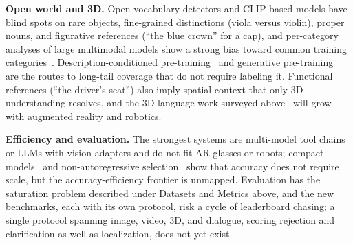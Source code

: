 \textbf{Open world and 3D.} Open-vocabulary detectors and CLIP-based models have blind spots on rare objects, fine-grained distinctions (viola versus violin), proper nouns, and figurative references (``the blue crown'' for a cap), and per-category analyses of large multimodal models show a strong bias toward common training categories~\cite{chen2025revisiting}. Description-conditioned pre-training~\cite{li2023desco} and generative pre-training~\cite{bagchi2025refereverything,gabeur2026image} are the routes to long-tail coverage that do not require labeling it. Functional references (``the driver's seat'') also imply spatial context that only 3D understanding resolves, and the 3D-language work surveyed above~\cite{hong20233d,zhen20243d} will grow with augmented reality and robotics.

\textbf{Efficiency and evaluation.} The strongest systems are multi-model tool chains or LLMs with vision adapters and do not fit AR glasses or robots; compact models~\cite{xiao2024florence,reid2026moondream} and non-autoregressive selection~\cite{cao2025refer} show that accuracy does not require scale, but the accuracy-efficiency frontier is unmapped. Evaluation has the saturation problem described under Datasets and Metrics above, and the new benchmarks, each with its own protocol, risk a cycle of leaderboard chasing; a single protocol spanning image, video, 3D, and dialogue, scoring rejection and clarification as well as localization, does not yet exist.
